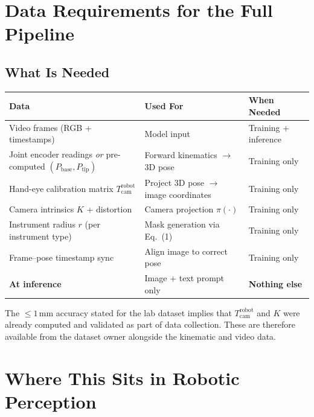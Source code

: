 \documentclass[11pt, a4paper]{article}
\begin{document}
\section{Data Requirements for the Full Pipeline}

\subsection{What Is Needed}

\begin{center}
\begin{tabular}{p{4cm} p{4.5cm} p{4cm}}
\toprule
\textbf{Data} & \textbf{Used For} & \textbf{When Needed} \\
\midrule
Video frames (RGB + timestamps) &
    Model input &
    Training + inference \\
Joint encoder readings \textit{or} pre-computed $(P_\text{base}, P_\text{tip})$ &
    Forward kinematics $\to$ 3D pose &
    Training only \\
Hand-eye calibration matrix $T_\text{cam}^\text{robot}$ &
    Project 3D pose $\to$ image coordinates &
    Training only \\
Camera intrinsics $K$ + distortion &
    Camera projection $\pi(\cdot)$ &
    Training only \\
Instrument radius $r$ (per instrument type) &
    Mask generation via Eq.~(1) &
    Training only \\
Frame--pose timestamp sync &
    Align image to correct pose &
    Training only \\
\midrule
\textbf{At inference} & Image + text prompt only & \textbf{Nothing else} \\
\bottomrule
\end{tabular}
\end{center}

The $\leq 1$\,mm accuracy stated for the lab dataset implies that
$T_\text{cam}^\text{robot}$ and $K$ were already computed and validated
as part of data collection. These are therefore available from the dataset
owner alongside the kinematic and video data.

\section{Where This Sits in Robotic Perception}
\end{document}
